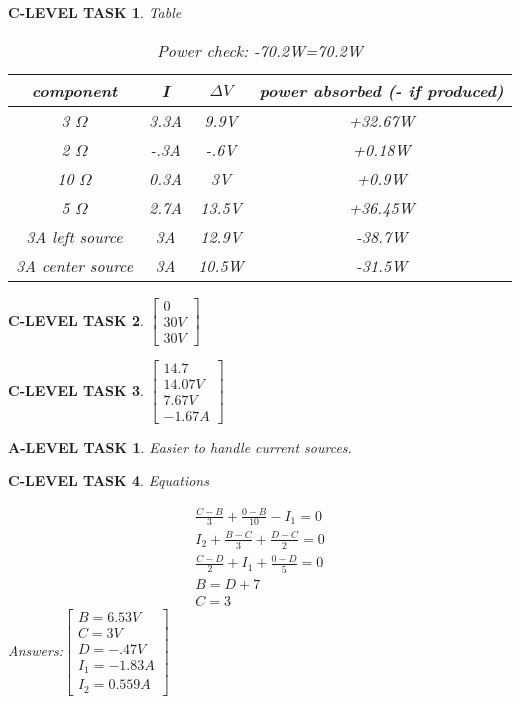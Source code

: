 \documentclass{book}
\numberwithin{equation}{section}
\newtheorem{alevel}{A-LEVEL TASK}
\newtheorem{clevel}{C-LEVEL TASK}
\theoremstyle{definition}
\begin{document}
\begin{clevel} Table\par
\begin{table}[H]
\begin{center}
\begin{tabular}{|c|c|c|c|} \hline
component & I&$\Delta V$&power absorbed (- if produced) \\ \hline
3 $\Omega$ &3.3A&9.9V&+32.67W	\\ \hline
2 $\Omega$&-.3A&-.6V&+0.18W	\\ \hline
10 $\Omega$ &0.3A&3V&+0.9W	\\ \hline
5 $\Omega$ &2.7A&13.5V&+36.45W	\\ \hline
3A left source &3A&12.9V&-38.7W	\\ \hline
3A center source &3A&10.5W&-31.5W	\\ \hline
\end{tabular}
\caption{Power check: -70.2W=70.2W}
\label{T:4PCheck}
\end{center}
\end{table}
\end{clevel}

\begin{clevel} $\left[ \begin{matrix}0\\30V\\30V \end{matrix}\right]$ 
\end{clevel}
\begin{clevel} $\left[ \begin{matrix}14.7\\14.07V\\7.67V\\-1.67A \end{matrix}\right]$ 
\end{clevel}
\begin{alevel} Easier to handle current sources. \end{alevel}

\begin{clevel} Equations\par
\begin{align}
\frac{C-B}{3}+\frac{0-B}{10}-I_1=0 \tag{Node B}\\
I_2 + \frac{B-C}{3}+\frac{D-C}{2}=0 \tag{Node C}\\
\frac{C-D}{2}+I_1+\frac{0-D}{5}=0 \tag{Node D}\\
B=D+7 \tag{Bonus Equation due to 7V Voltage Source}\\
C=3 \tag{Bonus Equation due to 3V Voltage Source}
\end{align} 
Answers:$\left[ \begin{matrix}B=6.53V\\C=3V\\D=-.47V\\I_1=-1.83A\\I_2=0.559A \end{matrix}\right]$ 
\end{clevel}
\end{document}
